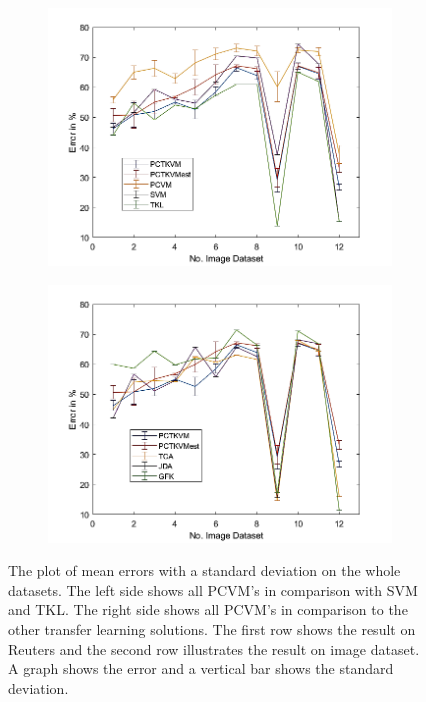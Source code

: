 \begin{figure}[!]
\begin{subfigure}{.5\textwidth}
		\includegraphics[width=1\linewidth]{figures/AverageImage.png}
		\caption{\label{FigErrorAvImTL}}
	\end{subfigure}%
	\begin{subfigure}{.5\textwidth}
		\centering
		\includegraphics[width=1\linewidth]{figures/AverageImageTL.png}
		\caption{\label{FigErrorAvImO}}
	\end{subfigure}
	\caption[Plot of Mean Error and Standard Deviation on the whole Datasets]{The plot of mean errors with a standard deviation on the whole datasets. The left side shows all \acs{PCVM}'s in comparison with \acs{SVM} and \acs{TKL}. The right side shows all \acs{PCVM}'s in comparison to the other transfer learning solutions. The first row shows the result on Reuters and the second row illustrates the result on image dataset. A graph shows the error and a vertical bar shows the standard deviation. \label{FigErrorAv}}
\end{figure}


